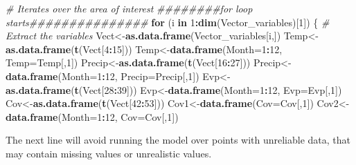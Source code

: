 \documentclass[
  10pt,
  b5paper,
]{book}
\newenvironment{Shaded}{\begin{snugshade}}{\end{snugshade}}
\newcommand{\CommentTok}[1]{\textcolor[rgb]{0.56,0.35,0.01}{\textit{#1}}}
\newcommand{\ControlFlowTok}[1]{\textcolor[rgb]{0.13,0.29,0.53}{\textbf{#1}}}
\newcommand{\DataTypeTok}[1]{\textcolor[rgb]{0.13,0.29,0.53}{#1}}
\newcommand{\DecValTok}[1]{\textcolor[rgb]{0.00,0.00,0.81}{#1}}
\newcommand{\KeywordTok}[1]{\textcolor[rgb]{0.13,0.29,0.53}{\textbf{#1}}}
\newcommand{\NormalTok}[1]{#1}
\newcommand{\OperatorTok}[1]{\textcolor[rgb]{0.81,0.36,0.00}{\textbf{#1}}}
\begin{document}
\begin{Shaded}
\begin{Highlighting}[]
\CommentTok{# Iterates over the area of interest}
\CommentTok{########for loop starts###############}
\ControlFlowTok{for}\NormalTok{ (i }\ControlFlowTok{in} \DecValTok{1}\OperatorTok{:}\KeywordTok{dim}\NormalTok{(Vector_variables)[}\DecValTok{1}\NormalTok{]) \{}
\CommentTok{# Extract the variables }
\NormalTok{Vect<-}\KeywordTok{as.data.frame}\NormalTok{(Vector_variables[i,])}
\NormalTok{Temp<-}\KeywordTok{as.data.frame}\NormalTok{(}\KeywordTok{t}\NormalTok{(Vect[}\DecValTok{4}\OperatorTok{:}\DecValTok{15}\NormalTok{]))}
\NormalTok{Temp<-}\KeywordTok{data.frame}\NormalTok{(}\DataTypeTok{Month=}\DecValTok{1}\OperatorTok{:}\DecValTok{12}\NormalTok{, }\DataTypeTok{Temp=}\NormalTok{Temp[,}\DecValTok{1}\NormalTok{])}
\NormalTok{Precip<-}\KeywordTok{as.data.frame}\NormalTok{(}\KeywordTok{t}\NormalTok{(Vect[}\DecValTok{16}\OperatorTok{:}\DecValTok{27}\NormalTok{]))}
\NormalTok{Precip<-}\KeywordTok{data.frame}\NormalTok{(}\DataTypeTok{Month=}\DecValTok{1}\OperatorTok{:}\DecValTok{12}\NormalTok{, }\DataTypeTok{Precip=}\NormalTok{Precip[,}\DecValTok{1}\NormalTok{])}
\NormalTok{Evp<-}\KeywordTok{as.data.frame}\NormalTok{(}\KeywordTok{t}\NormalTok{(Vect[}\DecValTok{28}\OperatorTok{:}\DecValTok{39}\NormalTok{]))}
\NormalTok{Evp<-}\KeywordTok{data.frame}\NormalTok{(}\DataTypeTok{Month=}\DecValTok{1}\OperatorTok{:}\DecValTok{12}\NormalTok{, }\DataTypeTok{Evp=}\NormalTok{Evp[,}\DecValTok{1}\NormalTok{])}
\NormalTok{Cov<-}\KeywordTok{as.data.frame}\NormalTok{(}\KeywordTok{t}\NormalTok{(Vect[}\DecValTok{42}\OperatorTok{:}\DecValTok{53}\NormalTok{]))}
\NormalTok{Cov1<-}\KeywordTok{data.frame}\NormalTok{(}\DataTypeTok{Cov=}\NormalTok{Cov[,}\DecValTok{1}\NormalTok{])}
\NormalTok{Cov2<-}\KeywordTok{data.frame}\NormalTok{(}\DataTypeTok{Month=}\DecValTok{1}\OperatorTok{:}\DecValTok{12}\NormalTok{, }\DataTypeTok{Cov=}\NormalTok{Cov[,}\DecValTok{1}\NormalTok{])}
\end{Highlighting}
\end{Shaded}

The next line will avoid running the model over points with unreliable data, that may contain missing values or unrealistic values.
\end{document}

